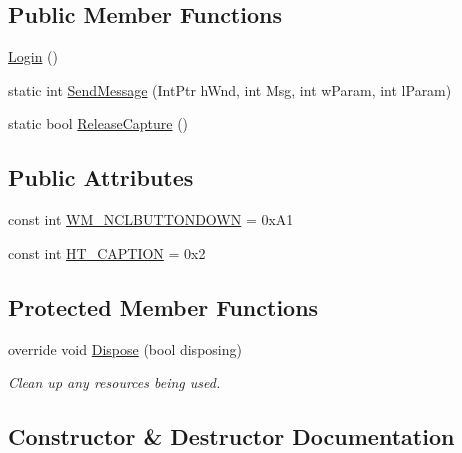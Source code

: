 \subsection*{Public Member Functions}
\begin{DoxyCompactItemize}
\item 
\hyperlink{class_health___assignment_1_1_login_a5a2c5cc532ffd914f45e4fbd0f683653}{Login} ()
\item 
static int \hyperlink{class_health___assignment_1_1_login_a94f5aef20bd1600a113d31e085428a2c}{Send\+Message} (Int\+Ptr h\+Wnd, int Msg, int w\+Param, int l\+Param)
\item 
static bool \hyperlink{class_health___assignment_1_1_login_adf210b2b8bea355dfa53988a6679cc71}{Release\+Capture} ()
\end{DoxyCompactItemize}
\subsection*{Public Attributes}
\begin{DoxyCompactItemize}
\item 
const int \hyperlink{class_health___assignment_1_1_login_a61931e455eab749c13b23318580b61a9}{W\+M\+\_\+\+N\+C\+L\+B\+U\+T\+T\+O\+N\+D\+O\+WN} = 0x\+A1
\item 
const int \hyperlink{class_health___assignment_1_1_login_a36b4719deec404dd0050b6cfb9888ea2}{H\+T\+\_\+\+C\+A\+P\+T\+I\+ON} = 0x2
\end{DoxyCompactItemize}
\subsection*{Protected Member Functions}
\begin{DoxyCompactItemize}
\item 
override void \hyperlink{class_health___assignment_1_1_login_a387f5a2afea3056180cbce02bff06a48}{Dispose} (bool disposing)
\begin{DoxyCompactList}\small\item\em Clean up any resources being used. \end{DoxyCompactList}\end{DoxyCompactItemize}


\subsection{Constructor \& Destructor Documentation}
\mbox{\label{class_health___assignment_1_1_login_a5a2c5cc532ffd914f45e4fbd0f683653}} 
